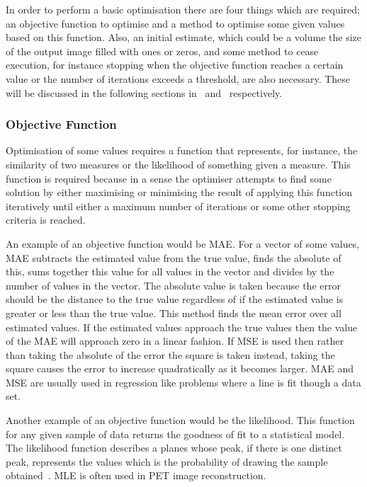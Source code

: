             In order to perform a basic optimisation there are four things which are required; an objective function to optimise  and a method to optimise some given values based on this function. Also, an initial estimate, which could be a volume the size of the output image filled with ones or zeros, and some method to cease execution, for instance stopping when the objective function reaches a certain value or the number of iterations exceeds a threshold, are also necessary. These will be discussed in the following sections in~ and~ respectively.
        
            \subsubsection{Objective Function} \label{sec:objective_function}
                Optimisation of some values requires a function that represents, for instance, the similarity of two measures or the likelihood of something given a measure. This function is required because in a sense the optimiser attempts to find some solution by either maximising or minimising the result of applying this function iteratively until either a maximum number of iterations or some other stopping criteria is reached.
                
                An example of an objective function would be \gls{MAE}. For a vector of some values, \gls{MAE} subtracts the estimated value from the true value, finds the absolute of this, sums together this value for all values in the vector and divides by the number of values in the vector. The absolute value is taken because the error should be the distance to the true value regardless of if the estimated value is greater or less than the true value. This method finds the mean error over all estimated values. If the estimated values approach the true values then the value of the \gls{MAE} will approach zero in a linear fashion. If \gls{MSE} is used then rather than taking the absolute of the error the square is taken instead, taking the square causes the error to increase quadratically as it becomes larger. %
                \gls{MAE} and \gls{MSE} are usually used in regression like problems where a line is fit though a data set.
                
                Another example of an objective function would be the likelihood. This function for any given sample of data returns the goodness of fit to a statistical model. %
                The likelihood function describes a planes whose peak, if there is one distinct peak, %
                represents the values which is %
                the probability of drawing the sample obtained~. \gls{MLE} is often used in \gls{PET} image reconstruction.
                
